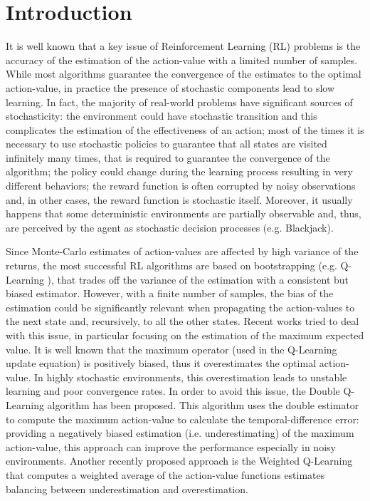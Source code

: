\documentclass[conference]{IEEEtran}
\begin{document}
\section{Introduction}
It is well known that a key issue of Reinforcement Learning (RL) problems is the accuracy of the estimation of the action-value with a limited number of samples. While most algorithms guarantee the convergence of the estimates to the optimal action-value, in practice the presence of stochastic components lead to slow learning. In fact, the majority of real-world problems have significant sources of stochasticity: the environment could have stochastic transition and this complicates the estimation of the effectiveness of an action; most of the times it is necessary to use stochastic policies to guarantee that all states are visited infinitely many times, that is required to guarantee the convergence of the algorithm; the policy could change during the learning process resulting in very different behaviors; the reward function is often corrupted by noisy observations and, in other cases, the reward function is stochastic itself. Moreover, it usually happens that some deterministic environments are partially observable and, thus, are perceived by the agent as stochastic decision processes (e.g. Blackjack).

Since Monte-Carlo estimates of action-values are affected by high variance of the returns, the most successful RL algorithms are based on bootstrapping (e.g. Q-Learning \cite{watkins1992q}), that trades off the variance of the estimation with a consistent but biased estimator. However, with a finite number of samples, the bias of the estimation could be significantly relevant when propagating the action-values to the next state and, recursively, to all the other states. Recent works tried to deal with this issue, in particular focusing on the estimation of the maximum expected value. 
It is well known \cite{smith2006optimizer, van2004rational} that the maximum operator (used in the Q-Learning update equation) is positively biased, thus it overestimates the optimal action-value. In highly stochastic environments, this overestimation leads to unstable learning and poor convergence rates. In order to avoid this issue, the Double Q-Learning algorithm \cite{van2010double} has been proposed. This algorithm uses the double estimator \cite{van2013estimating} to compute the maximum action-value to calculate the temporal-difference error: providing a negatively biased estimation (i.e. underestimating) of the maximum action-value, this approach can improve the performance especially in noisy environments.
Another recently proposed approach is the Weighted Q-Learning \cite{d2016estimating} that computes a weighted average of the action-value functions estimates balancing between underestimation and overestimation.
\end{document}
